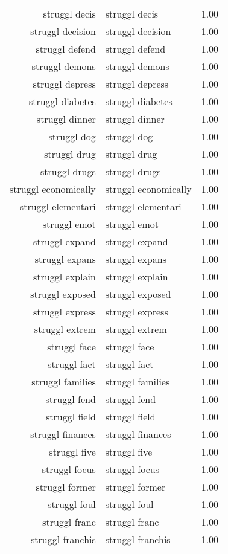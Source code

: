 \begin{table}[ht]
\begin{tabular}{rlr}
  struggl decis & struggl decis & 1.00 \\ 
  struggl decision & struggl decision & 1.00 \\ 
  struggl defend & struggl defend & 1.00 \\ 
  struggl demons & struggl demons & 1.00 \\ 
  struggl depress & struggl depress & 1.00 \\ 
  struggl diabetes & struggl diabetes & 1.00 \\ 
  struggl dinner & struggl dinner & 1.00 \\ 
  struggl dog & struggl dog & 1.00 \\ 
  struggl drug & struggl drug & 1.00 \\ 
  struggl drugs & struggl drugs & 1.00 \\ 
  struggl economically & struggl economically & 1.00 \\ 
  struggl elementari & struggl elementari & 1.00 \\ 
  struggl emot & struggl emot & 1.00 \\ 
  struggl expand & struggl expand & 1.00 \\ 
  struggl expans & struggl expans & 1.00 \\ 
  struggl explain & struggl explain & 1.00 \\ 
  struggl exposed & struggl exposed & 1.00 \\ 
  struggl express & struggl express & 1.00 \\ 
  struggl extrem & struggl extrem & 1.00 \\ 
  struggl face & struggl face & 1.00 \\ 
  struggl fact & struggl fact & 1.00 \\ 
  struggl families & struggl families & 1.00 \\ 
  struggl fend & struggl fend & 1.00 \\ 
  struggl field & struggl field & 1.00 \\ 
  struggl finances & struggl finances & 1.00 \\ 
  struggl five & struggl five & 1.00 \\ 
  struggl focus & struggl focus & 1.00 \\ 
  struggl former & struggl former & 1.00 \\ 
  struggl foul & struggl foul & 1.00 \\ 
  struggl franc & struggl franc & 1.00 \\ 
  struggl franchis & struggl franchis & 1.00 \\ 

\end{tabular}
\end{table}
